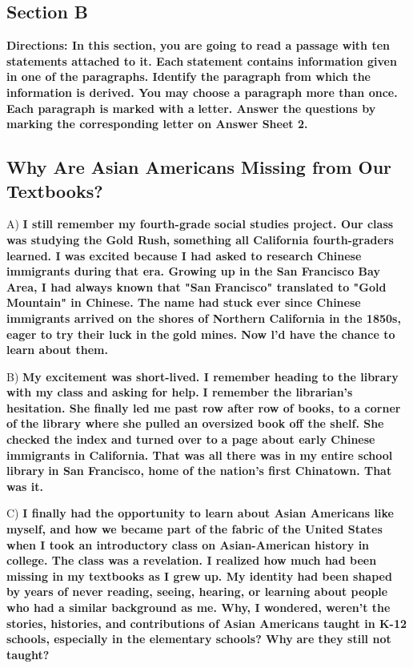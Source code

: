 \documentclass[UTF8,11pt]{ctexart}
\begin{document}
\subsection*{Section B}


\textbf{Directions: In this section, you are going to read a passage with ten statements attached to it. Each} \textbf{statement contains information given in one of the paragraphs. Identify the paragraph from which the} \textbf{information is derived. You may choose a paragraph more than once. Each paragraph is marked with a} \textbf{letter. Answer the questions by marking the corresponding letter on Answer Sheet 2.}


\subsection*{\textbf{Why Are Asian Americans Missing from Our Textbooks?}}


A) \textbf{I still remember my fourth-grade social studies project. Our class was studying the Gold Rush,} \textbf{something all California fourth-graders learned. I was excited because I had asked to research Chinese} \textbf{immigrants during that era. Growing up in the San Francisco Bay Area, I had always known that "San} \textbf{Francisco" translated to "Gold Mountain" in Chinese. The name had stuck ever since Chinese} \textbf{immigrants arrived on the shores of Northern California in the 1850s, eager to try their luck in the} \textbf{gold mines. Now l'd have the chance to learn about them.}


B) \textbf{My excitement was short-lived. I remember heading to the library with my class and asking for help.} \textbf{I remember the librarian's hesitation. She finally led me past row after row of books, to a corner of} \textbf{the library where she pulled an oversized book off the shelf. She checked the index and turned over to} \textbf{a page about early Chinese immigrants in California. That was all there was in my entire school library} \textbf{in San Francisco, home of the nation's first Chinatown. That was it.}


C) \textbf{I finally had the opportunity to learn about Asian Americans like myself, and how we became part of} \textbf{the fabric of the United States when I took an introductory class on Asian-American history in} \textbf{college. The class was a revelation. I realized how much had been missing in my textbooks as I grew} \textbf{up. My identity had been shaped by years of never reading, seeing, hearing, or learning about people} \textbf{who had a similar background as me. Why, I wondered, weren't the stories, histories, and} \textbf{contributions of Asian Americans taught in K-12 schools, especially in the elementary schools? Why} \textbf{are they still not taught?}
\end{document}

